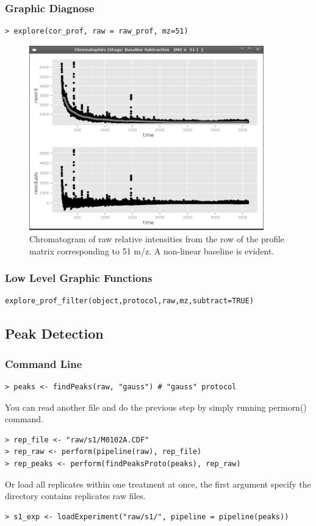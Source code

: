 \documentclass[11pt,a4paper]{article}
\begin{document}
\subsubsection*{Graphic Diagnose}
\begin{verbatim}
> explore(cor_prof, raw = raw_prof, mz=51)
\end{verbatim}
\begin{figure}[h!t!b!p]
\begin{center}
  \includegraphics[width=4in]{baseline51.png}
\caption{\label{fig:baseline51}Chromatogram of raw relative
  intensities from the row of the profile matrix corresponding to 51
  m/z. A non-linear baseline is evident.}
\end{center}
\end{figure}
\subsubsection*{Low Level Graphic Functions}
\begin{verbatim}
explore_prof_filter(object,protocol,raw,mz,subtract=TRUE)
\end{verbatim}


\subsection{Peak Detection}
\subsubsection*{Command Line}
\begin{verbatim}
> peaks <- findPeaks(raw, "gauss") # "gauss" protocol 
\end{verbatim}
You can read another file and do the previous step by simply running 
permorn() command.\\
\begin{verbatim}
> rep_file <- "raw/s1/M0102A.CDF"
> rep_raw <- perform(pipeline(raw), rep_file)
> rep_peaks <- perform(findPeaksProto(peaks), rep_raw)
\end{verbatim}
Or load all replicates within one treatment at once, the first argument specify the directory contains replicates raw files.\\
\begin{verbatim}
> s1_exp <- loadExperiment("raw/s1/", pipeline = pipeline(peaks))
\end{verbatim}
\end{document}
